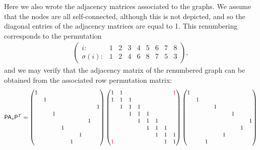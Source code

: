 \vspace{.2cm}
\noindent Here we also wrote the adjacency matrices associated to the graphs.
We assume that the nodes are all self-connected,
although this is not depicted,
and so the diagonal entries of the adjacency matrices are equal to 1.
This renumbering corresponds to the permutation
\begin{align*}
    \begin{pmatrix}
        i:         & 1 & 2 & 3 & 4 & 5 & 6 & 7 & 8 \\
        \sigma(i): & 1 & 2 & 4 & 6 & 8 & 7 & 5 & 3
    \end{pmatrix},
\end{align*}
and we may verify that the adjacency matrix of the renumbered graph can be obtained from the associated row permutation matrix:
\[
    \mathsf P \mathsf A_* \mathsf P^T
    =
    \begin{pmatrix}
        1 & \\
          & 1 \\
          & & & & & & & 1 \\
          & & 1 \\
          & & & & & & 1 \\
          & & & 1 \\
          & & & & & 1 \\
          & & & & 1
    \end{pmatrix}
    \begin{pmatrix}
        1 & 1 &   &   &   &   &   & {\color{red} 1} \\
        1 & 1 & 1 &   &   &   &   &   \\
          & 1 & 1 & 1 &   &   &   &   \\
          &   & 1 & 1 & 1 &   &   &   \\
          &   &   & 1 & 1 & 1 &   &   \\
          &   &   &   & 1 & 1 & 1 &   \\
          &   &   &   &   & 1 & 1 & 1 \\
        {\color{red} 1} &   &   &   &   &   & 1 & 1 \\
    \end{pmatrix}
    \begin{pmatrix}
        1 & \\
          & 1 \\
          & & & 1 \\
          & & & & & 1 \\
          & & & & & & & 1 \\
          & & & & & & 1 \\
          & & & & 1 \\
          & & 1 \\
    \end{pmatrix}
\]

